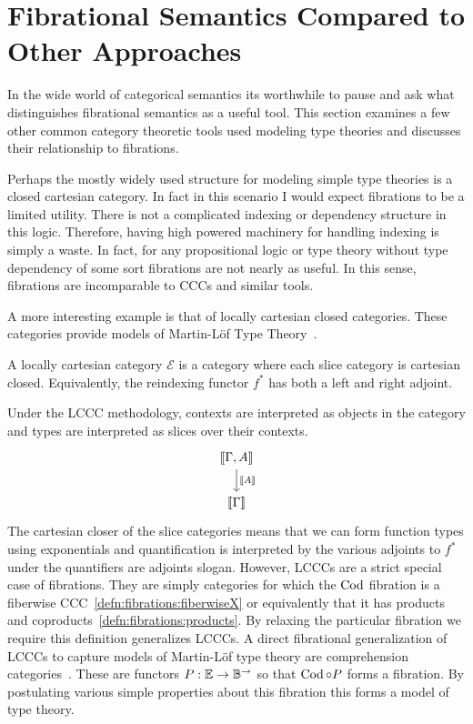 \section{Fibrational Semantics Compared to Other Approaches}

In the wide world of categorical semantics its worthwhile to pause and
ask what distinguishes fibrational semantics as a useful tool.
This section examines a few other common category theoretic tools used
modeling type theories and discusses their relationship to fibrations.

Perhaps the mostly widely used structure for modeling simple type
theories is a closed cartesian category. In fact in this scenario I
would expect fibrations to be a limited utility. There is not a
complicated indexing or dependency structure in this logic. Therefore,
having high powered machinery for handling indexing is simply a
waste. In fact, for any propositional logic or type theory without
type dependency of some sort fibrations are not nearly as useful. In
this sense, fibrations are incomparable to CCCs and similar tools.

A more interesting example is that of locally cartesian closed
categories. These categories provide models of Martin-L\"of Type
Theory~\cite{MartinLof:84}.
\begin{defn}\label{defn:othersemantics:lccc}
  A locally cartesian category $\mathcal{E}$ is a category where each
  slice category is cartesian closed. Equivalently, the reindexing
  functor $f^*$ has both a left and right adjoint.
\end{defn}
Under the LCCC methodology, contexts are interpreted as objects in the
category and types are interpreted as slices over their contexts.
\[
  \begin{tikzcd}
    \denote{\Gamma, A} \ar[d, "\denote{A}"]\\
    \denote{\Gamma}
  \end{tikzcd}
\]
The cartesian closer of the slice categories means that we can form
function types using exponentials and quantification is interpreted by
the various adjoints to $f^*$ under the quantifiers are adjoints
slogan. However, LCCCs are a strict special case of fibrations. They
are simply categories for which the $\operatorname{Cod}$ fibration is a fiberwise
CCC~\ref{defn:fibrations:fiberwiseX} or equivalently that it has
products and coproducts~\ref{defn:fibrations:products}. By relaxing
the particular fibration we require this definition generalizes
LCCCs. A direct fibrational generalization of LCCCs to capture models
of Martin-L\"of type theory are comprehension
categories~\cite{Jacobs:93}. These are functors $P : \mathbb{E} \to
\mathbb{B}^{\to}$ so that $\operatorname{Cod} \circ P$ forms a fibration. By postulating
various simple properties about this fibration this forms a model of
type theory.
